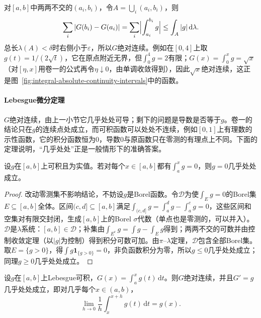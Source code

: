 对$[a,b]$中两两不交的$(a_i,b_i)$，令$A=\bigcup_i(a_i,b_i)$，则
\[
 \sum_i|G(b_i)-G(a_i)|=\sum_i\Bigl|\int_{a_i}^{b_i}g\Bigr|\le\int_A|g|\,\mathrm d\lambda.
\]
总长$\lambda(A)<\delta$时右侧小于$\varepsilon$，所以$G$绝对连续。例如在$[0,4]$上取$g(t)=1/(2\sqrt t)$，它在原点附近无界，但$\int_0^4g=2$有限；$G(x)=\int_0^xg=\sqrt x$（对$[\eta,x]$用卷一的公式再令$\eta\downarrow0$，由单调收敛得到），因此$\sqrt x$绝对连续，这正是图~\ref{fig:integral-absolute-continuity-intervals}中的函数。

\paragraph{Lebesgue微分定理}
$G$绝对连续，由上一小节它几乎处处可导；剩下的问题是导数是否等于$g$。卷一的结论只在$g$的连续点处成立，而可积函数可以处处不连续，例如$[0,1]$上有理数的示性函数，它的积分函数恒为$0$，导数$0$与原函数只在零测的有理点上不同。下面的定理说明，“几乎处处”正是一般情形下的准确答案。

\begin{lemma}[区间积分全为零的函数]
\label{lem:integral-vanishing-intervals}
设$g$在$[a,b]$上可积且为实值。若对每个$x\in[a,b]$都有$\int_a^xg=0$，则$g=0$几乎处处成立。
\end{lemma}

\begin{proof}
改动零测集不影响结论，不妨设$g$是Borel函数。令$\mathcal D$为使$\int_Eg=0$的Borel集$E\subseteq[a,b]$全体。区间$(c,d]\subseteq[a,b]$满足$\int_{(c,d]}g=\int_a^dg-\int_a^cg=0$，这些区间和空集对有限交封闭，生成$[a,b]$上的Borel $\sigma$代数（单点也是零测的，可以并入）。$\mathcal D$是$\lambda$系统：$[a,b]\in\mathcal D$；补集由$\int_{E^c}g=\int g-\int_Eg$得到；两两不交的可数并由控制收敛定理（以$|g|$为控制）得到积分可数可加。由$\pi$--$\lambda$定理，$\mathcal D$包含全部Borel集。取$E=\{g>0\}$，得$\int g\mathbf 1_{\{g>0\}}=0$，非负函数积分为零，所以$g\le0$几乎处处成立；同理$g\ge0$几乎处处成立。
\end{proof}

\begin{theorem}[Lebesgue微分定理]
\label{thm:integral-lebesgue-differentiation}
设$g$在$[a,b]$上Lebesgue可积，$G(x)=\int_a^xg(t)\,\mathrm dt$。则$G$绝对连续，并且$G'=g$几乎处处成立，即对几乎每个$x\in(a,b)$，
\[
 \lim_{h\to0}\frac1h\int_x^{x+h}g(t)\,\mathrm dt=g(x).
\]
\end{theorem}

